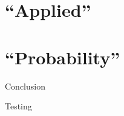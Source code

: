 \documentclass[a4paper,12pt,twoside]{report}
\begin{document}





\part{``Applied''}




\part{``Probability''}




%
%
%


Conclusion


Testing \cite{abate1995numerical}

% 


%
\end{document}
